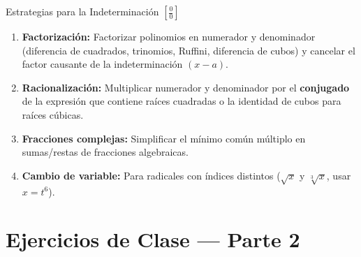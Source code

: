 \documentclass[aspectratio=169]{beamer}
\begin{document}
\begin{frame}{Estrategias para la Indeterminación $\left[\frac{0}{0}\right]$}
  \begin{mwpasos}
    \begin{enumerate}
      \item \textbf{Factorización:} Factorizar polinomios en numerador y denominador (diferencia de cuadrados, trinomios, Ruffini, diferencia de cubos) y cancelar el factor causante de la indeterminación $(x - a)$.
      \item \textbf{Racionalización:} Multiplicar numerador y denominador por el \textbf{conjugado} de la expresión que contiene raíces cuadradas o la identidad de cubos para raíces cúbicas.
      \item \textbf{Fracciones complejas:} Simplificar el mínimo común múltiplo en sumas/restas de fracciones algebraicas.
      \item \textbf{Cambio de variable:} Para radicales con índices distintos ($\sqrt{x}$ y $\sqrt[3]{x}$, usar $x = t^6$).
    \end{enumerate}
  \end{mwpasos}
\end{frame}



\section{Ejercicios de Clase — Parte 2}
\end{document}
